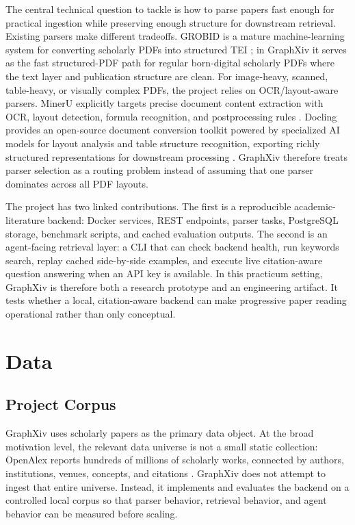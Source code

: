 \documentclass[10pt]{article}
\begin{document}
The central technical question to tackle is how to parse papers fast enough for practical ingestion while preserving enough structure for downstream retrieval. Existing parsers make different tradeoffs. GROBID is a mature machine-learning system for converting scholarly PDFs into structured TEI \citep{grobid}; in GraphXiv it serves as the fast structured-PDF path for regular born-digital scholarly PDFs where the text layer and publication structure are clean. For image-heavy, scanned, table-heavy, or visually complex PDFs, the project relies on OCR/layout-aware parsers. MinerU explicitly targets precise document content extraction with OCR, layout detection, formula recognition, and postprocessing rules \citep{wang2024mineru}. Docling provides an open-source document conversion toolkit powered by specialized AI models for layout analysis and table structure recognition, exporting richly structured representations for downstream processing \citep{livathinos2025docling}. GraphXiv therefore treats parser selection as a routing problem instead of assuming that one parser dominates across all PDF layouts.

The project has two linked contributions. The first is a reproducible academic-literature backend: Docker services, REST endpoints, parser tasks, PostgreSQL storage, benchmark scripts, and cached evaluation outputs. The second is an agent-facing retrieval layer: a CLI that can check backend health, run keywords search, replay cached side-by-side examples, and execute live citation-aware question answering when an API key is available. In this practicum setting, GraphXiv is therefore both a research prototype and an engineering artifact. It tests whether a local, citation-aware backend can make progressive paper reading operational rather than only conceptual.


\section{Data}

\subsection{Project Corpus}

GraphXiv uses scholarly papers as the primary data object. At the broad motivation level, the relevant data universe is not a small static collection: OpenAlex reports hundreds of millions of scholarly works, connected by authors, institutions, venues, concepts, and citations \citep{openalexabout,openalexconcepts}. GraphXiv does not attempt to ingest that entire universe. Instead, it implements and evaluates the backend on a controlled local corpus so that parser behavior, retrieval behavior, and agent behavior can be measured before scaling.
\end{document}
